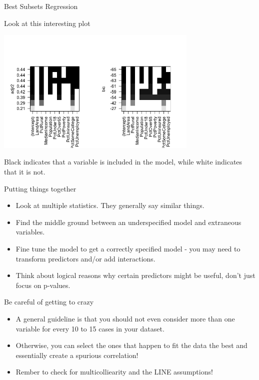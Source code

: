 \documentclass{beamer}\usepackage[]{graphicx}\usepackage[]{color}
\begin{document}
\begin{darkframes}
\begin{frame}[fragile]{Best Subsets Regression}
    \end{frame}

    \begin{frame}{Look at this interesting plot}
    \fontsize{8}{8}\selectfont
      \begin{center}
        \includegraphics[width=3.8in]{bestsubsets} \\
      \end{center} 

      \begin{center}
        {Black indicates that a variable is included in the model, while white indicates that it is not.}
      \end{center} 
      
    \end{frame}


    \begin{frame}[fragile]{Putting things together}
    \fontsize{8}{8}\selectfont
      \begin{itemize}[<+->]
        \item Look at multiple statistics. They generally say similar things.
        \item Find the middle ground between an underspecified model and extraneous variables.
        \item Fine tune the model to get a correctly specified model - you may need to transform predictors and/or add interactions.
        \item Think about logical reasons why certain predictors might be useful, don't just focus on p-values.
      \end{itemize} 
    \end{frame}


    \begin{frame}[fragile]{Be careful of getting to crazy}
    \fontsize{8}{8}\selectfont
      \begin{itemize}[<+->]
        \item A general guideline is that you should not even consider more than one variable for every 10 to 15 cases in your dataset. 
        \item Otherwise, you can select the ones that happen to fit the data the best and essentially create a spurious correlation!
        \item Rember to check for multicolliearity and the LINE assumptions!
      \end{itemize} 
    \end{frame}


  \end{darkframes}
\end{document}
